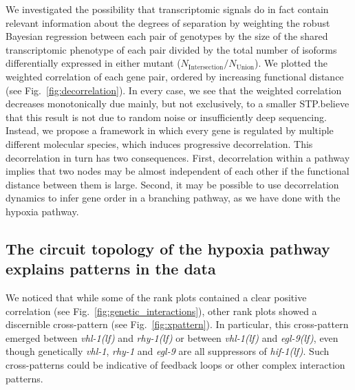 \documentclass[10pt, onecolumn]{article}
\newcommand{\gene}[1]{\emph{#1}}
\newcommand{\egl}{\emph{\mbox{egl-9}(lf)}}
\newcommand{\rhy}{\emph{\mbox{rhy-1}(lf)}}
\newcommand{\vhl}{\emph{\mbox{vhl-1}(lf)}}
\newcommand{\hif}{\emph{\mbox{hif-1(lf)}}}
\begin{document}
We investigated the possibility that transcriptomic signals do in fact contain
relevant information about the degrees of separation by weighting the robust
Bayesian regression between each pair of genotypes by the size of the shared
transcriptomic phenotype of each pair divided by the total number of isoforms
differentially expressed in either mutant
($N_\mathrm{Intersection}/N_{\mathrm{Union}}$). We plotted the weighted
correlation of each gene pair, ordered by increasing functional distance
(see Fig.~\ref{fig:decorrelation}). In every case, we see that the weighted
correlation decreases monotonically due mainly, but not exclusively, to a smaller
STP.\@We believe that this result is not due to random noise or insufficiently
deep sequencing. Instead, we propose a framework in which every gene is regulated
by multiple different molecular species, which induces progressive decorrelation.
This decorrelation in turn has two consequences. First, decorrelation within a
pathway implies that two nodes may be almost independent of each other if the
functional distance between them is large. Second, it may be possible to use
decorrelation dynamics to infer gene order in a branching pathway, as we have
done with the hypoxia pathway.

\subsection*{The circuit topology of the hypoxia pathway explains patterns in
            the data}
\label{sub:topology}
We noticed that while some of the rank plots contained a clear positive correlation
(see Fig.~\ref{fig:genetic_interactions}), other rank plots showed
a discernible cross-pattern (see Fig.~\ref{fig:xpattern}). In particular, this
cross-pattern emerged between \vhl{} and \rhy{} or between \vhl{} and \egl{},
even though genetically \gene{vhl-1}, \gene{rhy-1} and \gene{egl-9} are all
suppressors of \hif{}. Such cross-patterns could be indicative of feedback loops
or other complex interaction patterns.
\end{document}
